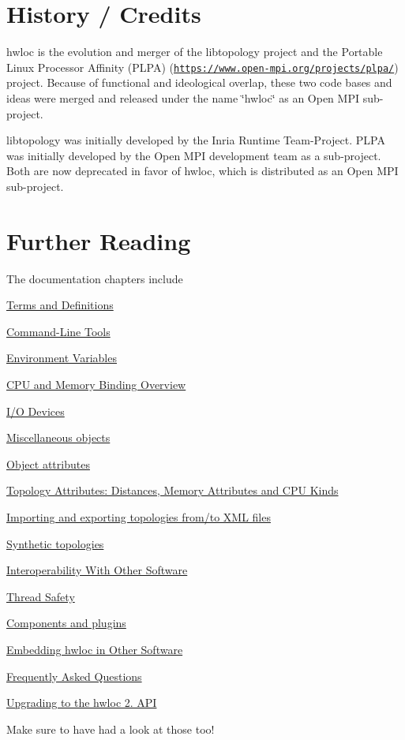  \hypertarget{a00379_history}{}\section{History / Credits}\label{a00379_history}
hwloc is the evolution and merger of the libtopology project and the Portable Linux Processor Affinity (P\+L\+PA) (\href{https://www.open-mpi.org/projects/plpa/}{\tt https\+://www.\+open-\/mpi.\+org/projects/plpa/}) project. Because of functional and ideological overlap, these two code bases and ideas were merged and released under the name \char`\"{}hwloc\char`\"{} as an Open M\+PI sub-\/project.

libtopology was initially developed by the Inria Runtime Team-\/\+Project. P\+L\+PA was initially developed by the Open M\+PI development team as a sub-\/project. Both are now deprecated in favor of hwloc, which is distributed as an Open M\+PI sub-\/project.

 \hypertarget{a00379_further_reading}{}\section{Further Reading}\label{a00379_further_reading}
The documentation chapters include


\begin{DoxyItemize}
\item \hyperlink{a00380}{Terms and Definitions} 
\item \hyperlink{a00381}{Command-\/\+Line Tools} 
\item \hyperlink{a00382}{Environment Variables} 
\item \hyperlink{a00383}{C\+PU and Memory Binding Overview} 
\item \hyperlink{a00384}{I/O Devices} 
\item \hyperlink{a00385}{Miscellaneous objects} 
\item \hyperlink{a00386}{Object attributes} 
\item \hyperlink{a00387}{Topology Attributes\+: Distances, Memory Attributes and C\+PU Kinds} 
\item \hyperlink{a00388}{Importing and exporting topologies from/to X\+ML files} 
\item \hyperlink{a00389}{Synthetic topologies} 
\item \hyperlink{a00390}{Interoperability With Other Software} 
\item \hyperlink{a00391}{Thread Safety} 
\item \hyperlink{a00392}{Components and plugins} 
\item \hyperlink{a00393}{Embedding hwloc in Other Software} 
\item \hyperlink{a00394}{Frequently Asked Questions} 
\item \hyperlink{a00395}{Upgrading to the hwloc 2. A\+PI} 
\end{DoxyItemize}

Make sure to have had a look at those too!

 